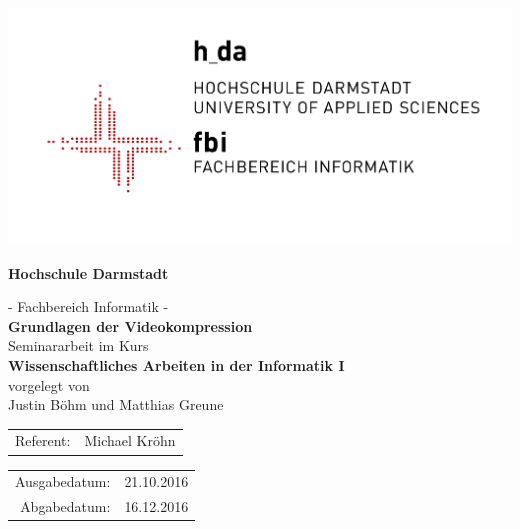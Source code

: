 
\begin{titlepage}
\begin{center}
\includegraphics[scale=1.5]{gfx/LG0_fbi_r5005_lzw.png}

\vspace{0.8cm}
{\sf

{\LARGE\textbf{Hochschule Darmstadt}}\\ 

{\Large - Fachbereich Informatik - \\ 

\vspace{2.0cm} 
{\Huge\textbf{Grundlagen der Videokompression}}\\ 

\vspace{2.0cm}
Seminararbeit im Kurs\\
\textbf{Wissenschaftliches Arbeiten in der Informatik I}\\ 

\vspace{1.0cm}
vorgelegt von\\ 
Justin Böhm und Matthias Greune

\vspace{1.0cm} 
\begin{tabular}{rl} 
Referent:& Michael Kröhn\\
\end{tabular}

\vspace{0.5cm}
\begin{tabular}{rl}
Ausgabedatum:& 21.10.2016\\
Abgabedatum:& 16.12.2016
\end{tabular}

} %

}

\end{center}
\end{titlepage}
